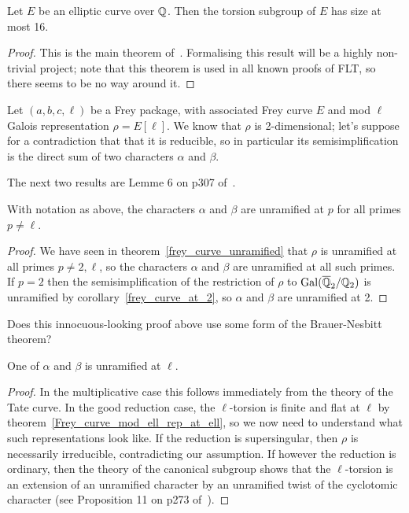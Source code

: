 \begin{theorem}\label{mazur} Let $E$ be an elliptic curve over $\mathbb{Q}$. Then the torsion subgroup
  of $E$ has size at most 16.
\end{theorem}
\begin{proof}
  This is the main theorem of~\cite{mazur-torsion}. Formalising this result will be a highly
  non-trivial project; note that this theorem is used in all known proofs of FLT, so there
  seems to be no way around it.
\end{proof}

Let $(a,b,c,\ell)$ be a Frey package, with associated Frey curve $E$ and mod $\ell$ Galois
 representation $\rho=E[\ell]$. We know that $\rho$ is 2-dimensional; let's suppose for a 
 contradiction that that it is
 reducible, so in particular its semisimplification is the direct sum of two characters $\alpha$
 and $\beta$.

 The next two results are Lemme 6 on p307 of~\cite{serrepropgal}.

\begin{theorem}\label{Frey_characters_are_unramified} With notation as above, the characters
  $\alpha$ and $\beta$ are unramified at $p$ for all primes $p\not=\ell$.
\end{theorem}
\begin{proof} We have seen in theorem~\ref{frey_curve_unramified} that $\rho$ is unramified at all 
  primes $p\not=2,\ell$, so the
  characters $\alpha$ and $\beta$ are unramified at all such primes. If $p=2$ then the
  semisimplification of the restriction of $\rho$ to $\operatorname{Gal}(\overline{\mathbb{Q}}_2/\mathbb{Q}_2)$ is unramified
  by corollary~\ref{frey_curve_at_2}, so $\alpha$ and $\beta$ are unramified at 2.
\end{proof}

\begin{remark} Does this innocuous-looking proof above use some form of the Brauer-Nesbitt theorem?
\end{remark}

\begin{theorem}\label{Frey_characters_at_ell} One of $\alpha$ and $\beta$ is unramified at $\ell$.
\end{theorem}
\begin{proof}
In the multiplicative case this follows immediately from the theory of the Tate curve.
In the good reduction case, the $\ell$-torsion is finite and flat at $\ell$ by theorem~\ref{Frey_curve_mod_ell_rep_at_ell}, so we now need to understand what such representations
look like. If the reduction is supersingular, then $\rho$ is necessarily irreducible,
contradicting our assumption. If however the reduction is ordinary, then the theory of the
canonical subgroup shows that the $\ell$-torsion is an extension of an unramified character by
an unramified twist of the cyclotomic character (see Proposition 11 on p273 of~\cite{serrepropgal}).
\end{proof}

